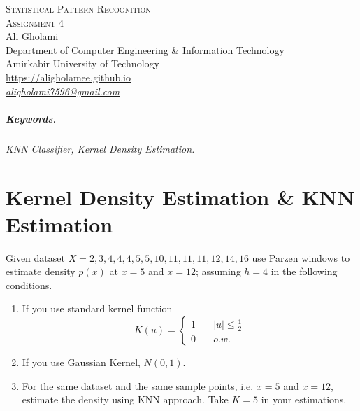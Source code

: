 \documentclass[12pt]{article}
\numberwithin{equation}{section}
\numberwithin{table}{section}
\numberwithin{figure}{section}
\begin{document}

\begin{center}
\textsc{\Large Statistical Pattern Recognition} \\[2pt]
	\textsc{\large Assignment 4}\\
	\vspace{0.5cm}
  Ali Gholami \\[6pt]
  Department of Computer Engineering \& Information Technology\\
  Amirkabir University of Technology  \\[6pt]
  \def\UrlFont{\em}
  \url{https://aligholamee.github.io}\\
    \href{mailto:aligholami7596@gmail.com}{\textit{aligholami7596@gmail.com}}
\end{center}

\begin{abstract}

\end{abstract}

\subparagraph{Keywords.} \textit{KNN Classifier, Kernel Density Estimation.}

\section{Kernel Density Estimation \& KNN Estimation}
Given dataset $ X = 2, 3, 4, 4, 4, 5, 5, 10, 11, 11, 11, 12, 14, 16 $ use Parzen windows to estimate density $p(x)$ at $x = 5$ and $x = 12$; assuming $h = 4$ in the following conditions.
\begin{enumerate}[label=(\alph*)]
	\item If you use standard kernel function
	\[ K(u) =
	\begin{cases}
	1      & \quad |u| \leq \frac{1}{2}\\
	0  & \quad o.w.
	\end{cases}
	\]


	\item If you use Gaussian Kernel, $N(0, 1)$.
	
	\item For the same dataset and the same sample points, i.e. $x = 5$ and $x = 12$, estimate the density using KNN approach. Take $ K = 5$ in your estimations.

\end{enumerate}
\end{document}
